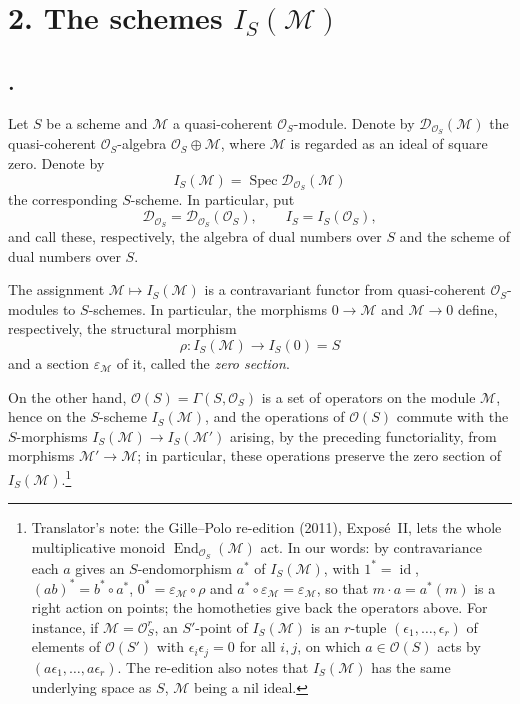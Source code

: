 \section*{2. The schemes \(I_S(\mathcal M)\)}

\subsection*{.}
Let \(S\) be a scheme and \(\mathcal M\) a quasi-coherent
\(\mathcal O_S\)-module. Denote by
\(\mathscr D_{\mathcal O_S}(\mathcal M)\) the quasi-coherent
\(\mathcal O_S\)-algebra \(\mathcal O_S\oplus\mathcal M\), where
\(\mathcal M\) is regarded as an ideal of square zero. Denote by
\[
  I_S(\mathcal M)=\operatorname{Spec}
    \mathscr D_{\mathcal O_S}(\mathcal M)
\]
the corresponding \(S\)-scheme.
In particular, put
\[
  \mathscr D_{\mathcal O_S}
  =\mathscr D_{\mathcal O_S}(\mathcal O_S),
  \qquad I_S=I_S(\mathcal O_S),
\]
and call these, respectively, the algebra of dual numbers over \(S\) and
the scheme of dual numbers over \(S\).

The assignment \(\mathcal M\mapsto I_S(\mathcal M)\) is a contravariant
functor from quasi-coherent \(\mathcal O_S\)-modules to \(S\)-schemes.
In particular, the morphisms \(0\to\mathcal M\) and
\(\mathcal M\to0\) define, respectively, the structural morphism
\[
  \rho:I_S(\mathcal M)\longrightarrow I_S(0)=S
\]
and a section \(\varepsilon_{\mathcal M}\) of it, called the
\emph{zero section}.

%
On the other hand, \(\mathcal O(S)=\Gamma(S,\mathcal O_S)\) is a set of
operators on the module \(\mathcal M\), hence on the \(S\)-scheme
\(I_S(\mathcal M)\), and the operations of \(\mathcal O(S)\) commute with
the \(S\)-morphisms \(I_S(\mathcal M)\to I_S(\mathcal M')\) arising, by the
preceding functoriality, from morphisms \(\mathcal M'\to\mathcal M\); in
particular, these operations preserve the zero section of
\(I_S(\mathcal M)\).\footnote{Translator's note: the Gille--Polo re-edition
(2011), Expos\'e~II, lets the whole multiplicative monoid
\(\operatorname{End}_{\mathcal O_S}(\mathcal M)\) act. In our words: by
contravariance each \(a\) gives an \(S\)-endomorphism \(a^*\) of
\(I_S(\mathcal M)\), with \(1^*=\operatorname{id}\), \((ab)^*=b^*\circ a^*\),
\(0^*=\varepsilon_{\mathcal M}\circ\rho\) and
\(a^*\circ\varepsilon_{\mathcal M}=\varepsilon_{\mathcal M}\), so that
\(m\cdot a=a^*(m)\) is a right action on points; the homotheties give back
the operators above. For instance, if \(\mathcal M=\mathcal O_S^r\), an
\(S'\)-point of \(I_S(\mathcal M)\) is an \(r\)-tuple
\((\epsilon_1,\dots,\epsilon_r)\) of elements of \(\mathcal O(S')\) with
\(\epsilon_i\epsilon_j=0\) for all \(i,j\), on which \(a\in\mathcal O(S)\)
acts by \((a\epsilon_1,\dots,a\epsilon_r)\). The re-edition also notes that
\(I_S(\mathcal M)\) has the same underlying space as \(S\), \(\mathcal M\)
being a nil ideal.}

